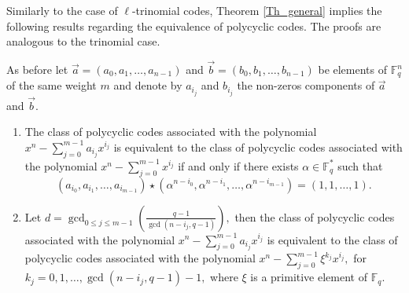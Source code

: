 \documentclass[12pt]{elsarticle}
\def\dsum #1#2{\displaystyle{\sum_{#1}^{#2}}}
\newcommand{\Fq}{\mathbb{F}_{q}}
\theoremstyle{break}
{\theorembodyfont{\upshape}
    \newtheorem{theorem}{Theorem}[section] %
    \newtheorem{lemma}[theorem]{Lemma} %
    \newtheorem{proposition}[theorem]{Proposition}
    \newtheorem{corollary}[theorem]{Corollary}
    \newtheorem{definition}[theorem]{Definition}
    \newtheorem{example}[theorem]{Example}
    \newtheorem{remark}[theorem]{Remark}
    \newtheorem{conjecture}[theorem]{Conjecture}
    \newtheorem*{proof}{{Proof}}
	\newtheorem*{notation}{Notation}
	\newtheorem*{main}{Cain Theorem}
	\newtheorem*{problem}{Problem}
}
\begin{document}
Similarly to the case of $\ell$-trinomial codes, Theorem \ref{Th_general} implies the following results regarding the equivalence of polycyclic codes. The proofs are analogous to the trinomial case. 

\begin{corollary}\label{Equiv_General2}
As before let $ \vec{a}=(a_0,a_1,\ldots, a_{n-1})$ and $ \vec{b}=(b_0,b_1,\ldots, b_{n-1})$ be elements of $\mathbb{F}_q^{n}$  
of the same weight $m$  and denote by $ a_{i_j}$ and $  b_{i_j}$  the non-zeros components of $\vec{a}$ and $\vec{b}$. 
\begin{enumerate}
    \item      The class of polycyclic  codes associated with the polynomial $ x^n-\dsum{j=0}{m-1} a_{i_j} x^{i_j} $ is equivalent to the class of  polycyclic  codes associated with the polynomial  $x^n-\dsum{j=0}{m-1}  x^{i_j}$  if and only if there exists $\alpha \in \Fq^*$ such that 
    $$ ( a_{i_0}, a_{i_1},\ldots, a_{i_{m-1}})\star( \alpha^{n-i_0}, \alpha^{n-i_1},\ldots, \alpha^{n-i_{m-1}}) = (1, 1,\ldots, 1 ).$$  
    \item  Let  $ d=\gcd_{ 0\leq j\leq m-1} \left( \frac{q-1}{ \gcd(n-i_j,q-1)}\right) ,$ then the  class of polycyclic  codes associated with the  polynomial $ x^n-\dsum{j=0}{m-1} a_{i_j} x^{i_j} $ is equivalent to the class of  polycyclic  codes associated with the polynomial  $ x^n-\dsum{j=0}{m-1} \xi^{k_j} x^{i_j} ,$ for $k_j=0,1,\ldots, \gcd(n-i_j,q-1)-1 ,$  where $\xi$ is a primitive element of $ \Fq$. 
\end{enumerate}
    \end{corollary} 
\end{document}

